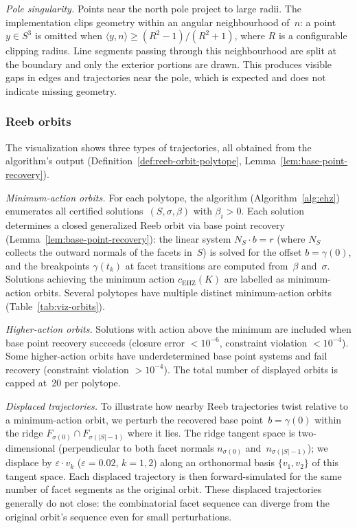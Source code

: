 \emph{Pole singularity.}
Points near the north pole project to large radii.
The implementation clips geometry within an angular neighbourhood
of~$n$: a point~$y \in S^3$ is omitted when
$\langle y, n \rangle \geq (R^2 - 1)/(R^2 + 1)$,
where $R$ is a configurable clipping radius.
Line segments passing through this neighbourhood are split at the
boundary and only the exterior portions are drawn.
This produces visible gaps in edges and trajectories near the pole,
which is expected and does not indicate missing geometry.

\subsubsection*{Reeb orbits}

The visualization shows three types of trajectories,
all obtained from the algorithm's output
(Definition~\ref{def:reeb-orbit-polytope},
Lemma~\ref{lem:base-point-recovery}).

\emph{Minimum-action orbits.}
For each polytope, the algorithm (Algorithm~\ref{alg:ehz})
enumerates all certified solutions~$(S, \sigma, \beta)$
with $\beta_i > 0$.
Each solution determines a closed generalized Reeb orbit
via base point recovery (Lemma~\ref{lem:base-point-recovery}):
the linear system $N_S \cdot b = r$ (where $N_S$ collects the
outward normals of the facets in~$S$) is solved for
the offset $b = \gamma(0)$, and the breakpoints
$\gamma(t_k)$ at facet transitions are computed from~$\beta$
and~$\sigma$.
Solutions achieving the minimum action $c_\mathrm{EHZ}(K)$
are labelled as minimum-action orbits.
Several polytopes have multiple distinct minimum-action orbits
(Table~\ref{tab:viz-orbits}).

\emph{Higher-action orbits.}
Solutions with action above the minimum are included
when base point recovery succeeds
(closure error ${} < 10^{-6}$,
constraint violation ${} < 10^{-4}$).
Some higher-action orbits have underdetermined base point
systems and fail recovery
(constraint violation ${} > 10^{-4}$).
The total number of displayed orbits is capped at~20
per polytope.

\emph{Displaced trajectories.}
To illustrate how nearby Reeb trajectories twist relative
to a minimum-action orbit, we perturb the recovered base
point~$b = \gamma(0)$ within the ridge
$F_{\sigma(0)} \cap F_{\sigma(|S|-1)}$ where it lies.
The ridge tangent space is two-dimensional
(perpendicular to both facet normals $n_{\sigma(0)}$
and~$n_{\sigma(|S|-1)}$); we displace by
$\varepsilon \cdot v_k$ ($\varepsilon = 0.02$, $k = 1, 2$)
along an orthonormal basis $\{v_1, v_2\}$ of this tangent space.
Each displaced trajectory is then forward-simulated for the
same number of facet segments as the original orbit.
These displaced trajectories generally do not close:
the combinatorial facet sequence can diverge from the
original orbit's sequence even for small perturbations.

